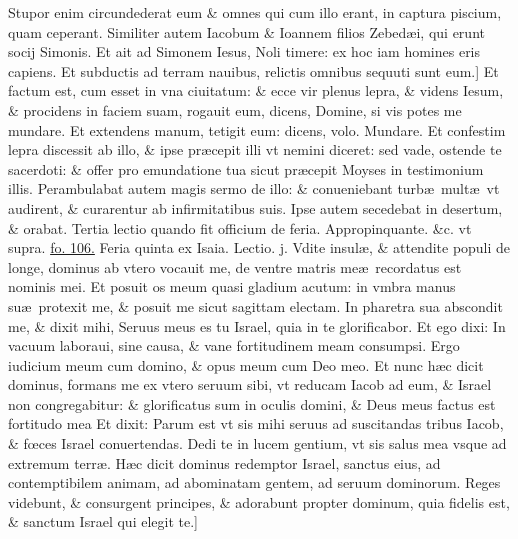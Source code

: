 \documentclass[a5paper,10pt]{book}
\def\leftmarginnote{%
	\lrmarginnote{\hskip -\marginparsep \hskip -6.5em}}
\def\rightmarginnote{%
	\lrmarginnote{\hskip\columnwidth \hskip -1em}}
\def\ae{æ}
\def\oe{œ}
\begin{document}
\begin{multicols*}{2}
Stupor enim circundederat eum \& omnes qui cum illo erant, in captura piscium, quam ceperant.
Similiter autem Iacobum \& Ioannem filios Zebed\ae i, qui erunt socij Simonis.
Et ait ad Simonem Iesus, Noli timere: ex hoc iam homines eris capiens.
Et subductis ad terram nauibus, relictis omnibus sequuti sunt eum.]
Et\leftmarginnote{\begin{flushright}B\end{flushright}} factum est, cum esset in vna ciuitatum: \& ecce vir plenus lepra, \& videns Iesum, \& procidens in faciem suam, rogauit eum, dicens, Domine, si vis potes me mundare.
Et extendens manum, tetigit eum: dicens, volo.
Mundare. Et confestim lepra discessit ab illo, \& ipse pr\ae cepit illi vt nemini diceret: sed vade, ostende te sacerdoti: \& offer pro emundatione tua sicut pr\ae cepit Moyses in testimonium illis.
Perambulabat autem magis sermo de illo: \& conueniebant turb\ae \ mult\ae \ vt audirent, \& curarentur ab infirmitatibus suis.
Ipse autem secedebat in desertum, \& orabat.
\newline \color{red} Tertia lectio quando fit officium de feria. \color{black} Appropinquante. \&c. \color{red} vt supra. \color{black} \hyperlink{page.106}{fo. 106.}
\newline {} \color{red} \hypertarget{THU-SECUNDA-ADV}{Feria quinta} ex Isaia. \hfill Lectio. j. \color{black}
\vspace{-.25em}
\textdagger Vdite\rightmarginnote{c. 49.\\a} insul\ae , \& attendite populi de longe, dominus ab vtero vocauit me, de ventre matris me\ae \ recordatus est nominis mei.
Et posuit os meum quasi gladium acutum: in vmbra manus su\ae \ protexit me, \& posuit me sicut sagittam electam.
In pharetra sua abscondit me, \& dixit mihi, Seruus meus es tu Israel, quia in te glorificabor.
Et ego dixi: In vacuum laboraui, sine causa, \& vane fortitudinem meam consumpsi.
Ergo iudicium meum cum domino, \& opus meum cum Deo meo.
Et nunc h\ae c dicit dominus, formans me ex vtero seruum sibi, vt reducam Iacob ad eum, \& Israel non congregabitur: \& glorificatus sum in oculis domini, \& Deus meus factus est fortitudo mea
Et dixit: Parum est vt sis mihi seruus ad suscitandas tribus Iacob, \& f\oe ces Israel conuertendas.
Dedi te in lucem gentium, vt sis salus mea vsque ad extremum terr\ae .
H\ae c dicit dominus redemptor Israel, sanctus eius, ad contemptibilem animam, ad abominatam gentem, ad seruum dominorum. 
Reges videbunt, \& consurgent principes, \& adorabunt propter dominum, quia fidelis est, \& sanctum Israel qui elegit te.]

\end{multicols*}
\end{document}
